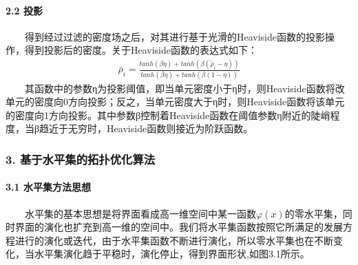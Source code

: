 \documentclass[letterpaper,10pt,english]{sphinxmanual}
\begin{document}






\paragraph{2.2 投影}
\label{\detokenize{_u7b80_u4ecb/_u6838_u5fc3_u8bbe_u8ba1_u4f18_u5316_u7b97_u6cd5/_u68af_u5ea6_u62d3_u6251_u4f18_u5316_u6a21_u5757/_u68af_u5ea6_u62d3_u6251_u4f18_u5316_u7b97_u6cd5:id7}}
\sphinxAtStartPar
  得到经过过滤的密度场之后，对其进行基于光滑的Heaviside函数的投影操作，得到投影后的密度。关于Heaviside函数的表达式如下：
\begin{equation*}
\begin{split}\bar{ρ}_i=\frac{tanh(βη)+tanh(β(\tilde{ρ}_i-η))}{tanh(βη)+tanh(β(1-η))}\end{split}
\end{equation*}
\sphinxAtStartPar
  其函数中的参数η为投影阈值，即当单元密度小于η时，则Heaviside函数将改单元的密度向0方向投影；反之，当单元密度大于η时，则Heaviside函数将该单元的密度向1方向投影。其中参数β控制着Heaviside函数在阈值参数η附近的陡峭程度，当β趋近于无穷时，Heaviside函数则接近为阶跃函数。


\subsubsection{3. 基于水平集的拓扑优化算法}
\label{\detokenize{_u7b80_u4ecb/_u6838_u5fc3_u8bbe_u8ba1_u4f18_u5316_u7b97_u6cd5/_u68af_u5ea6_u62d3_u6251_u4f18_u5316_u6a21_u5757/_u68af_u5ea6_u62d3_u6251_u4f18_u5316_u7b97_u6cd5:id8}}

\paragraph{3.1 水平集方法思想}
\label{\detokenize{_u7b80_u4ecb/_u6838_u5fc3_u8bbe_u8ba1_u4f18_u5316_u7b97_u6cd5/_u68af_u5ea6_u62d3_u6251_u4f18_u5316_u6a21_u5757/_u68af_u5ea6_u62d3_u6251_u4f18_u5316_u7b97_u6cd5:id9}}
\sphinxAtStartPar
  水平集的基本思想是将界面看成高一维空间中某一函数\(φ(x)\)的零水平集，同时界面的演化也扩充到高一维的空间中。我们将水平集函数按照它所满足的发展方程进行的演化或迭代，由于水平集函数不断进行演化，所以零水平集也在不断变化，当水平集演化趋于平稳时，演化停止，得到界面形状,如图3.1所示。


\sphinxAtStartPar
{}
\end{document}
